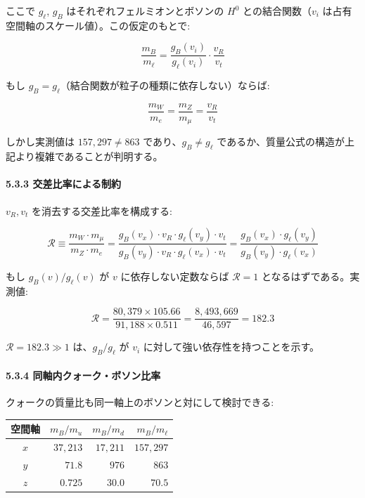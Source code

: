 \documentclass[
  a4paper,11pt]{ltjsarticle}
\newcounter{none} %
\begin{document}
ここで \(g_\ell\), \(g_B\) はそれぞれフェルミオンとボソンの \(H^0\)
との結合関数（\(v_i\) は占有空間軸のスケール値）。この仮定のもとで:

\[\frac{m_B}{m_\ell} = \frac{g_B(v_i)}{g_\ell(v_i)} \cdot \frac{v_R}{v_t}\]

もし \(g_B = g_\ell\)（結合関数が粒子の種類に依存しない）ならば:

\[\frac{m_W}{m_e} = \frac{m_Z}{m_\mu} = \frac{v_R}{v_t}\]

しかし実測値は \(157{,}297 \neq 863\) であり、\(g_B \neq g_\ell\)
であるか、質量公式の構造が上記より複雑であることが判明する。

\paragraph{5.3.3
交差比率による制約}\label{ux4ea4ux5deeux6bd4ux7387ux306bux3088ux308bux5236ux7d04}

\(v_R, v_t\) を消去する交差比率を構成する:

\[\mathcal{R} \equiv \frac{m_W \cdot m_\mu}{m_Z \cdot m_e} = \frac{g_B(v_x) \cdot v_R \cdot g_\ell(v_y) \cdot v_t}{g_B(v_y) \cdot v_R \cdot g_\ell(v_x) \cdot v_t} = \frac{g_B(v_x) \cdot g_\ell(v_y)}{g_B(v_y) \cdot g_\ell(v_x)}\]

もし \(g_B(v) / g_\ell(v)\) が \(v\) に依存しない定数ならば
\(\mathcal{R} = 1\) となるはずである。実測値:

\[\mathcal{R} = \frac{80{,}379 \times 105.66}{91{,}188 \times 0.511} = \frac{8{,}493{,}669}{46{,}597} = 182.3\]

\(\mathcal{R} = 182.3 \gg 1\) は、\(g_B / g_\ell\) が \(v_i\)
に対して強い依存性を持つことを示す。

\paragraph{5.3.4
同軸内クォーク・ボソン比率}\label{ux540cux8ef8ux5185ux30afux30a9ux30fcux30afux30dcux30bdux30f3ux6bd4ux7387}

クォークの質量比も同一軸上のボソンと対にして検討できる:

{\def\LTcaptype{none} %
\begin{longtable}[]{@{}crrr@{}}
\toprule\noalign{}
空間軸 & \(m_B / m_u\) & \(m_B / m_d\) & \(m_B / m_\ell\) \\
\midrule\noalign{}
\endhead
\bottomrule\noalign{}
\endlastfoot
\(x\) & \(37{,}213\) & \(17{,}211\) & \(157{,}297\) \\
\(y\) & \(71.8\) & \(976\) & \(863\) \\
\(z\) & \(0.725\) & \(30.0\) & \(70.5\) \\
\end{longtable}
}
\end{document}
